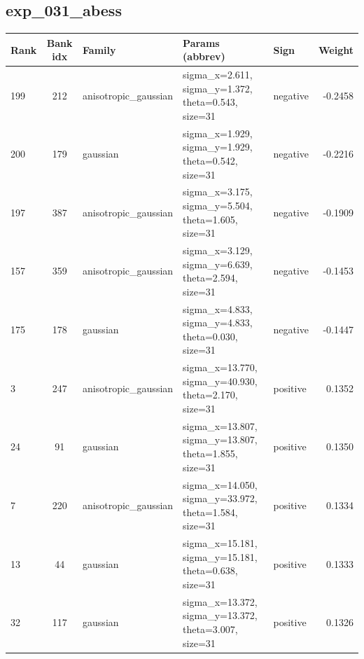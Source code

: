 \documentclass{article}
\begin{document}
\subsection*{exp\_031\_abess}
\begin{center}
\begin{tabular}{lclllr}
\toprule
Rank & Bank idx & Family & Params (abbrev) & Sign & Weight \\
\midrule

199 & 212 & anisotropic\_gaussian & sigma\_x=2.611, sigma\_y=1.372, theta=0.543, size=31 & negative & -0.2458 \\
200 & 179 & gaussian & sigma\_x=1.929, sigma\_y=1.929, theta=0.542, size=31 & negative & -0.2216 \\
197 & 387 & anisotropic\_gaussian & sigma\_x=3.175, sigma\_y=5.504, theta=1.605, size=31 & negative & -0.1909 \\
157 & 359 & anisotropic\_gaussian & sigma\_x=3.129, sigma\_y=6.639, theta=2.594, size=31 & negative & -0.1453 \\
175 & 178 & gaussian & sigma\_x=4.833, sigma\_y=4.833, theta=0.030, size=31 & negative & -0.1447 \\
3 & 247 & anisotropic\_gaussian & sigma\_x=13.770, sigma\_y=40.930, theta=2.170, size=31 & positive & 0.1352 \\
24 & 91 & gaussian & sigma\_x=13.807, sigma\_y=13.807, theta=1.855, size=31 & positive & 0.1350 \\
7 & 220 & anisotropic\_gaussian & sigma\_x=14.050, sigma\_y=33.972, theta=1.584, size=31 & positive & 0.1334 \\
13 & 44 & gaussian & sigma\_x=15.181, sigma\_y=15.181, theta=0.638, size=31 & positive & 0.1333 \\
32 & 117 & gaussian & sigma\_x=13.372, sigma\_y=13.372, theta=3.007, size=31 & positive & 0.1326 \\
\bottomrule
\end{tabular}
\end{center}
\end{document}
